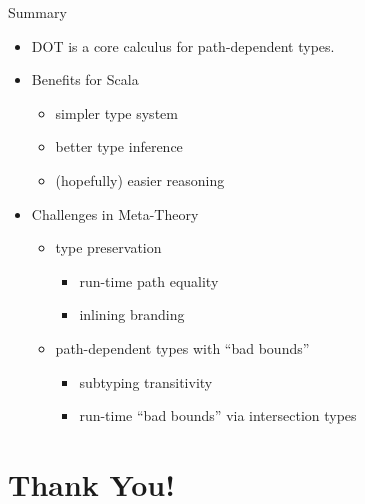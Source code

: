 \documentclass{beamer}
\begin{document}
\begin{frame}[fragile]{Summary}
\begin{itemize}
\item DOT is a core calculus for path-dependent types.
\item Benefits for Scala
\begin{itemize}
\item simpler type system
\item better type inference
\item (hopefully) easier reasoning
\end{itemize}
\item Challenges in Meta-Theory
\begin{itemize}
\item type preservation
\begin{itemize}
\item run-time path equality
\item inlining branding
\end{itemize}
\item path-dependent types with ``bad bounds''
\begin{itemize}
\item subtyping transitivity
\item run-time ``bad bounds'' via intersection types
\end{itemize}
\end{itemize}
\end{itemize}
\end{frame}

\section{Thank You!}
\end{document}
